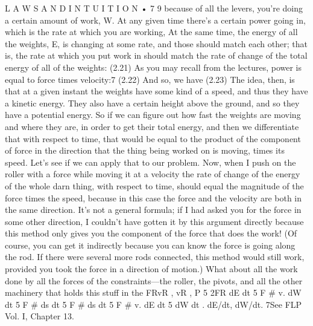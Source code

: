 \documentclass[10pt,oneside]{article}
\begin{document}
L A W S  A N D  I N T U I T I O N • 7 9 because of all the levers, you’re doing a certain amount of work, W. At any given time there’s a certain power going in, which is the rate at which you are working, At the same time, the energy of all the weights, E, is changing at some rate, and those should match each other; that is, the rate at which you put work in should match the rate of change of the total energy of all of the weights: (2.21) As you may recall from the lectures, power is equal to force times velocity:7 (2.22) And so, we have (2.23) The idea, then, is that at a given instant the weights have some kind of a speed, and thus they have a kinetic energy. They also have a certain height above the ground, and so they have a potential energy. So if we can figure out how fast the weights are moving and where they are, in order to get their total energy, and then we differentiate that with respect to time, that would be equal to the product of the component of force in the direction that the thing being worked on is moving, times its speed. Let’s see if we can apply that to our problem. Now, when I push on the roller with a force while moving it at a velocity the rate of change of the energy of the whole darn thing, with respect to time, should equal the magnitude of the force times the speed, because in this case the force and the velocity are both in the same direction. It’s not a general formula; if I had asked you for the force in some other direction, I couldn’t have gotten it by this argument directly because this method only gives you the component of the force that does the work! (Of course, you can get it indirectly because you can know the force is going along the rod. If there were several more rods connected, this method would still work, provided you took the force in a direction of motion.) What about all the work done by all the forces of the constraints---the roller, the pivots, and all the other machinery that holds this stuff in the FRvR , vR , P 5 2FR dE dt 5 F \# v. dW dt 5 F \# ds dt 5 F \# ds dt 5 F \# v. dE dt 5 dW dt . dE/dt, dW/dt. 7See FLP Vol. I, Chapter 13.\par
\end{document}
